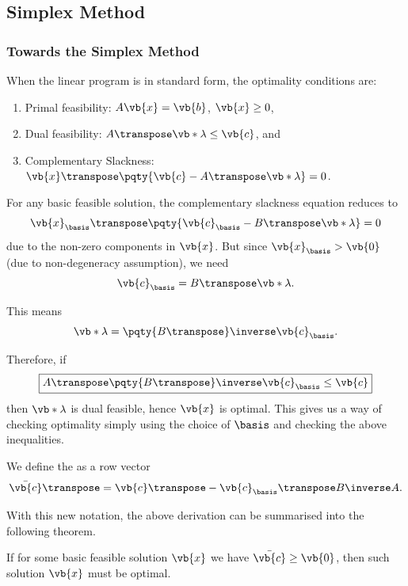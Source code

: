 \subsection{Simplex Method}
\subsubsection{Towards the Simplex Method}

When the linear program is in standard form, the optimality conditions are:
\begin{enumerate}
    \item Primal feasibility: \(A\vb{x} = \vb{b}\), \(\vb{x} \geq 0\),
    \item Dual feasibility: \(A\transpose \vb*{\lambda} \leq \vb{c}\), and
    \item Complementary Slackness: \(\vb{x}\transpose \pqty{\vb{c} - A\transpose \vb*{\lambda}} = 0\).
\end{enumerate}

For any basic feasible solution, the complementary slackness equation reduces to
\[
    \vb{x}_{\basis}\transpose \pqty{\vb{c}_{\basis} - B\transpose \vb*{\lambda}} = 0
\]
due to the non-zero components in \(\vb{x}\). But since \(\vb{x}_{\basis} > \vb{0}\) (due to non-degeneracy assumption), we need
\[
    \vb{c}_{\basis} = B\transpose \vb*{\lambda}.
\]  

This means
\[
    \vb*{\lambda} = \pqty{B\transpose}\inverse \vb{c}_{\basis}.
\]

Therefore, if
\[
    \boxed{A\transpose \pqty{B\transpose}\inverse \vb{c}_{\basis} \leq \vb{c}}
\]
then \(\vb*{\lambda}\) is dual feasible, hence \(\vb{x}\) is optimal. This gives us a way of checking optimality simply using the choice of \(\basis\) and checking the above inequalities.

\begin{definition}
    We define the  as a row vector
    \[
        \bar{\vb{c}}\transpose = \vb{c}\transpose - \vb{c}_{\basis}
        \transpose B\inverse A.
    \]
\end{definition}

With this new notation, the above derivation can be summarised into the following theorem.

\begin{theorem}
    If for some basic feasible solution \(\vb{x}\) we have \(\bar{\vb{c}} \geq \vb{0}\), then such solution \(\vb{x}\) must be optimal.
\end{theorem}

